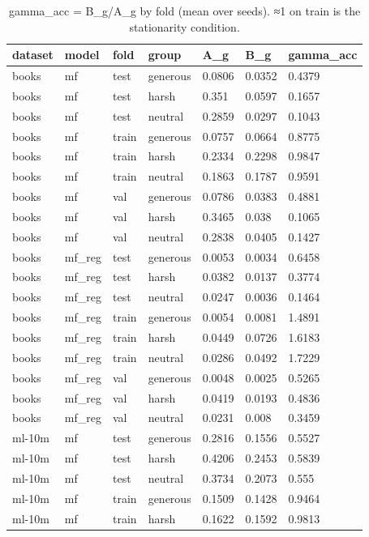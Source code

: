 \begin{table}[h]
\centering
\caption{gamma_acc = B_g/A_g by fold (mean over seeds). ≈1 on train is the stationarity condition.}
\small
\begin{tabular}{lllllll}
\toprule
dataset & model & fold & group & A\_g & B\_g & gamma\_acc \\
\midrule
books & mf & test & generous & 0.0806 & 0.0352 & 0.4379 \\
books & mf & test & harsh & 0.351 & 0.0597 & 0.1657 \\
books & mf & test & neutral & 0.2859 & 0.0297 & 0.1043 \\
books & mf & train & generous & 0.0757 & 0.0664 & 0.8775 \\
books & mf & train & harsh & 0.2334 & 0.2298 & 0.9847 \\
books & mf & train & neutral & 0.1863 & 0.1787 & 0.9591 \\
books & mf & val & generous & 0.0786 & 0.0383 & 0.4881 \\
books & mf & val & harsh & 0.3465 & 0.038 & 0.1065 \\
books & mf & val & neutral & 0.2838 & 0.0405 & 0.1427 \\
books & mf\_reg & test & generous & 0.0053 & 0.0034 & 0.6458 \\
books & mf\_reg & test & harsh & 0.0382 & 0.0137 & 0.3774 \\
books & mf\_reg & test & neutral & 0.0247 & 0.0036 & 0.1464 \\
books & mf\_reg & train & generous & 0.0054 & 0.0081 & 1.4891 \\
books & mf\_reg & train & harsh & 0.0449 & 0.0726 & 1.6183 \\
books & mf\_reg & train & neutral & 0.0286 & 0.0492 & 1.7229 \\
books & mf\_reg & val & generous & 0.0048 & 0.0025 & 0.5265 \\
books & mf\_reg & val & harsh & 0.0419 & 0.0193 & 0.4836 \\
books & mf\_reg & val & neutral & 0.0231 & 0.008 & 0.3459 \\
ml-10m & mf & test & generous & 0.2816 & 0.1556 & 0.5527 \\
ml-10m & mf & test & harsh & 0.4206 & 0.2453 & 0.5839 \\
ml-10m & mf & test & neutral & 0.3734 & 0.2073 & 0.555 \\
ml-10m & mf & train & generous & 0.1509 & 0.1428 & 0.9464 \\
ml-10m & mf & train & harsh & 0.1622 & 0.1592 & 0.9813 \\

\end{tabular}
\end{table}
